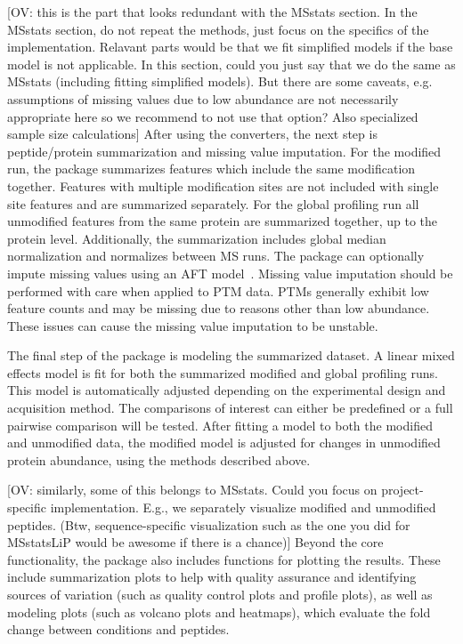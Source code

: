 \documentclass[mcp]{article}
\numberwithin{table}{section}
\def\todo#1{{\color{red}[#1]}}
\begin{document}
\todo{OV: this is the part that looks redundant with the MSstats section. In the MSstats section, do not repeat the methods, just focus on the specifics of the implementation. Relavant parts would be that we fit simplified models if the base model is not applicable. In this section,  could you just say that we do the same as MSstats (including fitting simplified models). But there are some caveats, e.g. assumptions of missing values due to low abundance are not necessarily appropriate here so we recommend to not use that option? Also specialized sample size calculations} After using the converters, the next step is peptide/protein summarization and missing value imputation. For the modified run, the package summarizes features which include the same modification together. Features with multiple modification sites are not included with single site features and are summarized separately. For the global profiling run all unmodified features from the same protein are summarized together, up to the protein level. Additionally, the summarization includes global median normalization and normalizes between MS runs. The package can optionally impute missing values using an AFT model~\cite{Wei:1992}. Missing value imputation should be performed with care when applied to PTM data. PTMs generally exhibit low feature counts and may be missing due to reasons other than low abundance. These issues can cause the missing value imputation to be unstable.

The final step of the package is modeling the summarized dataset. A linear mixed effects model is fit for both the summarized modified and global profiling runs. This model is automatically adjusted depending on the experimental design and acquisition method. The comparisons of interest can either be predefined or a full pairwise comparison will be tested. After fitting a model to both the modified and unmodified data, the modified model is adjusted for changes in unmodified protein abundance, using the methods described above.

\todo{OV: similarly, some of this belongs to MSstats. Could you focus on project-specific implementation. E.g., we separately visualize modified and unmodified peptides. (Btw, sequence-specific visualization such as the one you did for MSstatsLiP would be awesome if there is a chance)} Beyond the core functionality, the package also includes functions for plotting the results. These include summarization plots to help with quality assurance and identifying sources of variation (such as quality control plots and profile plots), as well as modeling plots (such as volcano plots and heatmaps), which evaluate the fold change between conditions and peptides. 
\end{document}
